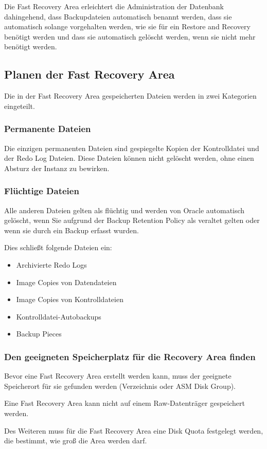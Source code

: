       Die Fast Recovery Area erleichtert die Administration der Datenbank dahingehend, dass Backupdateien automatisch benannt werden, dass sie automatisch solange vorgehalten werden, wie sie für ein Restore and Recovery benötigt werden und dass sie automatisch gelöscht werden, wenn sie nicht mehr benötigt werden.
      \subsection{Planen der Fast Recovery Area}
        Die in der Fast Recovery Area gespeicherten Dateien werden in zwei Kategorien eingeteilt.
        \subsubsection{Permanente Dateien}
          Die einzigen permanenten Dateien sind gespiegelte Kopien der Kontrolldatei und der Redo Log Dateien. Diese Dateien können nicht gelöscht werden, ohne einen Absturz der Instanz zu bewirken.
        \subsubsection{Flüchtige Dateien}
          Alle anderen Dateien gelten als flüchtig und werden von Oracle automatisch gelöscht, wenn Sie aufgrund der Backup Retention Policy als veraltet gelten oder wenn sie durch ein Backup erfasst wurden.

          Dies schließt folgende Dateien ein:
          \begin{itemize}
            \item Archivierte Redo Logs
            \item Image Copies von Datendateien
            \item Image Copies von Kontrolldateien
            \item Kontrolldatei-Autobackups
            \item Backup Pieces
          \end{itemize}
        \subsubsection{Den geeigneten Speicherplatz für die Recovery Area finden}
          Bevor eine Fast Recovery Area erstellt werden kann, muss der geeignete
          Speicherort für sie gefunden werden (Verzeichnis oder ASM Disk
          Group).
\clearpage
          \begin{merke}
            Eine Fast Recovery Area kann nicht auf einem Raw-Datenträger gespeichert werden.
          \end{merke}
          Des Weiteren muss für die Fast Recovery Area eine Disk Quota festgelegt werden, die bestimmt, wie groß die Area werden darf.

